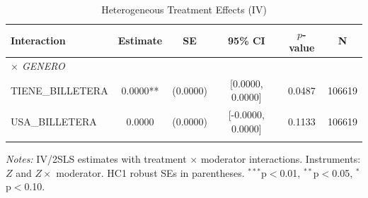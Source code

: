 \begin{table}[htbp]
\centering
\caption{Heterogeneous Treatment Effects (IV)}
\label{tab:heterogeneity}
\begin{tabular}{l ccccc}
\toprule
Interaction & Estimate & SE & 95\% CI & $p$-value & N \\
\midrule
\multicolumn{6}{l}{\textit{$\times$ GENERO}} \\
  TIENE_BILLETERA & 0.0000** & (0.0000) & [0.0000, 0.0000] & 0.0487 & 106619 \\
  USA_BILLETERA & 0.0000 & (0.0000) & [-0.0000, 0.0000] & 0.1133 & 106619 \\
\addlinespace
\bottomrule
\end{tabular}
\begin{tablenotes}
\small
\item \textit{Notes:} IV/2SLS estimates with treatment $\times$ moderator interactions. Instruments: $Z$ and $Z \times$ moderator. HC1 robust SEs in parentheses. $^{***}$p$<$0.01, $^{**}$p$<$0.05, $^{*}$p$<$0.10.
\end{tablenotes}
\end{table}